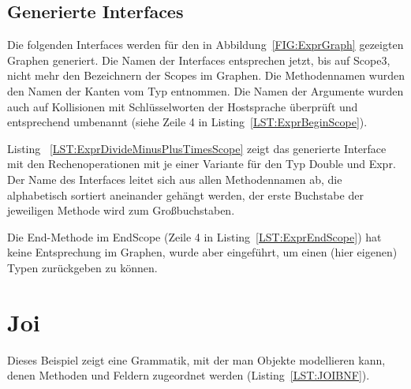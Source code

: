 \documentclass[../InterneDSLs.tex]{subfiles}
\begin{document}
\subsection{Generierte Interfaces}
Die folgenden Interfaces werden für den in Abbildung~\ref{FIG:ExprGraph} gezeigten Graphen generiert. Die Namen der Interfaces entsprechen jetzt, bis auf Scope3, nicht mehr den Bezeichnern der Scopes im Graphen. Die Methodennamen wurden den Namen der Kanten vom Typ  entnommen. Die Namen der Argumente wurden auch auf Kollisionen mit Schlüsselworten der Hostsprache überprüft und entsprechend umbenannt (siehe Zeile 4 in Listing~\ref{LST:ExprBeginScope}).
\begin{figure}[ht]
    
\end{figure}

\begin{figure}[ht]

\end{figure}

Listing ~\ref{LST:ExprDivideMinusPlusTimesScope} zeigt das generierte Interface mit den Rechenoperationen mit je einer Variante für den Typ Double und Expr. Der Name des Interfaces leitet sich aus allen Methodennamen ab, die alphabetisch sortiert aneinander gehängt werden, der erste Buchstabe der jeweiligen Methode wird zum Großbuchstaben.
\begin{figure}[ht]
    
\end{figure}

Die End-Methode im EndScope (Zeile 4 in Listing~\ref{LST:ExprEndScope}) hat keine Entsprechung im Graphen, wurde aber eingeführt, um einen (hier eigenen) Typen zurückgeben zu können.
\begin{figure}[ht]
    
\end{figure}


\section{Joi}
Dieses Beispiel zeigt eine Grammatik, mit der man Objekte modellieren kann, denen Methoden und Feldern zugeordnet werden (Listing~\ref{LST:JOIBNF}).
\begin{figure}[ht]
    
\end{figure}
\end{document}
